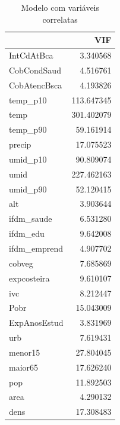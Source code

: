 \documentclass[12pt,a4paper]{article}\usepackage[]{graphicx}\usepackage[]{color}
\newenvironment{knitrout}{}{} %
\begin{document}
\begin{knitrout}
\color{fgcolor}\begin{table}[H]

\caption{\label{tab:unnamed-chunk-9}Modelo com variáveis correlatas}
\centering
\begin{tabular}[t]{l|r}
\hline
  & VIF\\
\hline
IntCdAtBca & 3.340568\\
\hline
CobCondSaud & 4.516761\\
\hline
CobAtencBsca & 4.193826\\
\hline
temp\_p10 & 113.647345\\
\hline
temp & 301.402079\\
\hline
temp\_p90 & 59.161914\\
\hline
precip & 17.075523\\
\hline
umid\_p10 & 90.809074\\
\hline
umid & 227.462163\\
\hline
umid\_p90 & 52.120415\\
\hline
alt & 3.903644\\
\hline
ifdm\_saude & 6.531280\\
\hline
ifdm\_edu & 9.642008\\
\hline
ifdm\_emprend & 4.907702\\
\hline
cobveg & 7.685869\\
\hline
expcosteira & 9.610107\\
\hline
ivc & 8.212447\\
\hline
Pobr & 15.043009\\
\hline
ExpAnosEstud & 3.831969\\
\hline
urb & 7.619431\\
\hline
menor15 & 27.804045\\
\hline
maior65 & 17.626240\\
\hline
pop & 11.892503\\
\hline
area & 4.290132\\
\hline
dens & 17.308483\\
\hline
\end{tabular}
\end{table}

\begin{table}[H]


\end{table}
\end{knitrout}
\end{document}
